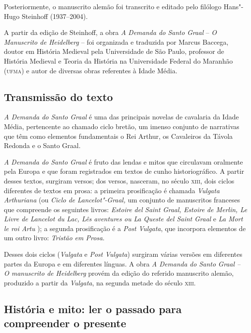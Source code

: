\documentclass[11pt]{extarticle}
\begin{document}
Posteriormente, o manuscrito alemão foi transcrito e editado pelo
filólogo Hans"-Hugo Steinhoff (1937--2004).

A partir da edição de Steinhoff, a obra \emph{A} \emph{Demanda do Santo
Graal} -- \emph{O Manuscrito de Heidelberg} -- foi organizada e
traduzida por Marcus Baccega, doutor em História Medieval pela
Universidade de São Paulo, professor de História Medieval e Teoria da
História na Universidade Federal do Maranhão (\textsc{ufma}) e autor de diversas
obras referentes à Idade Média.

\subsection{Transmissão do texto}

\emph{A Demanda do Santo Graal} é uma das
principais novelas de cavalaria da Idade Média, pertencente ao chamado
ciclo bretão, um imenso conjunto de narrativas que têm como elementos
fundamentais o Rei Arthur, os Cavaleiros da Távola Redonda e o Santo
Graal. 


\emph{A} \emph{Demanda do Santo Graal} é fruto das lendas e mitos
que circulavam oralmente pela Europa e que foram registrados em textos
de cunho historiográfico. A partir desses textos, surgiram versos; dos
versos, nasceram, no século \textsc{xiii}, dois ciclos diferentes de textos em
prosa: a primeira prosificação é chamada \emph{Vulgata Arthuriana} (ou
\emph{Ciclo de Lancelot"-Graal,} um conjunto de manuscritos franceses que
compreende os seguintes livros: \emph{Estoire del Saint Graal, Estoire
de Merlin, Le Livre de Lancelot du Lac, Lês aventures ou La Queste del
Saint Graal} e \emph{La Mort le roi Artu} ); a segunda prosificação é a
\emph{Post Vulgata}, que incorpora elementos de um outro livro:
\emph{Tristão em Prosa}.



Desses dois ciclos (\emph{Vulgata} e \emph{Post
Vulgata}) surgiram várias versões em diferentes partes da Europa e em
diferentes línguas. A obra \emph{A Demanda do Santo Graal -- O
manuscrito de Heidelberg} provém da edição do referido manuscrito
alemão, produzido a partir da \emph{Vulgata}, na segunda metade do
século \textsc{xiii}.


\subsection{História e mito: ler o passado para compreender o presente}
\end{document}
